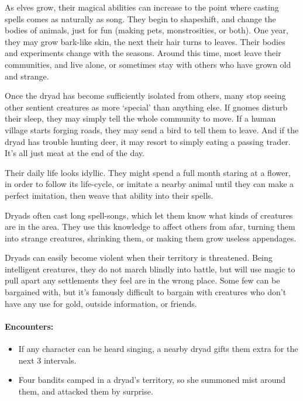 \begin{multicols}{2}

\noindent
As elves grow, their magical abilities can increase to the point where casting spells comes as naturally as song.
They begin to shapeshift, and change the bodies of animals, just for fun (making pets, monstrosities, or both).
One year, they may grow bark-like skin, the next their hair turns to leaves.
Their bodies and experiments change with the seasons.
Around this time, most leave their communities, and live alone, or sometimes stay with others who have grown old and strange.

Once the dryad has become sufficiently isolated from others, many stop seeing other sentient creatures as more `special' than anything else.
If gnomes disturb their sleep, they may simply tell the whole community to move.
If a human \gls{village} starts forging roads, they may send a bird to tell them to leave.
And if the dryad has trouble hunting deer, it may resort to simply eating a passing trader.
It's all just meat at the end of the day.

Their daily life looks idyllic.
They might spend a full month staring at a flower, in order to follow its life-cycle, or imitate a nearby animal until they can make a perfect imitation, then weave that ability into their spells.

\dryad

\showStdSpells

Dryads often cast long spell-songs, which let them know what kinds of creatures are in the area.
They use this knowledge to affect others from afar, turning them into strange creatures, shrinking them, or making them grow useless appendages.

Dryads can easily become violent when their territory is threatened.
Being intelligent creatures, they do not march blindly into battle, but will use magic to pull apart any settlements they feel are in the wrong place.
Some few can be bargained with, but it's famously difficult to bargain with creatures who don't have any use for gold, outside information, or friends.

\paragraph{Encounters:}

\begin{itemize}

  \item
  If any character can be heard singing, a nearby dryad gifts them extra  for the next 3 \glspl{interval}.
  \item
  Four bandits camped in a dryad's territory, so she summoned mist around them, and attacked them by surprise.


\end{itemize}
\end{multicols}
